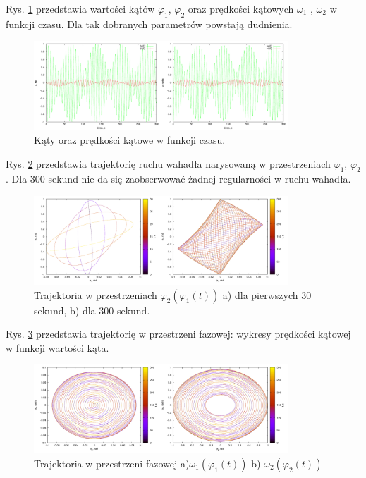 \documentclass[11pt]{aghdpl}
\begin{document}
Rys. \ref{phi1_2odt.} przedstawia wartości kątów $\varphi_1$, $\varphi_2$ oraz prędkości kątowych $\omega_1$ , $\omega_2$ w funkcji czasu. Dla tak dobranych parametrów powstają dudnienia.
\begin{figure}[h!]
	\centering
	\includegraphics[width=0.85\textwidth]{phi1_2t.pdf}
	\caption{Kąty oraz prędkości kątowe w funkcji czasu.}	
	\label{phi1_2odt.}
\end{figure}

Rys. \ref{phi1_phi2} przedstawia trajektorię ruchu wahadła narysowaną w przestrzeniach $\varphi_1$, $\varphi_2$. Dla 300 sekund nie da się zaobserwować żadnej regularności w ruchu wahadła.
\begin{figure}[h!]
	\centering
	\includegraphics[width=0.85\textwidth]{phi1_phi2.pdf}
	\caption{Trajektoria w przestrzeniach $\varphi_2(\varphi_1(t))$ \quad a) dla pierwszych 30 sekund, \quad b) dla 300 sekund.}
	\label{phi1_phi2}
\end{figure}

Rys. \ref{phi_omega} przedstawia trajektorię w przestrzeni fazowej: wykresy prędkości kątowej w funkcji wartości kąta. 
\begin{figure}[h!]
	\centering
	\includegraphics[width=0.85\textwidth]{phi1_omega1.pdf}
	\caption{Trajektoria w przestrzeni fazowej a)$\omega_1(\varphi_1(t))$ b) $\omega_2(\varphi_2(t))$	}
	\label{phi_omega}
\end{figure}
\end{document}
